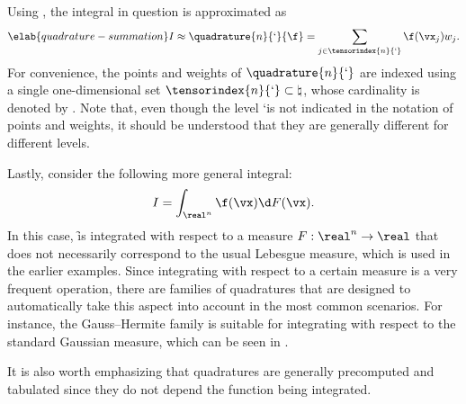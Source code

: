 Using , the integral in question is approximated as
\begin{equation} \elab{quadrature-summation}
  I \approx \quadrature{n}{\lq}{\f}
  = \sum_{j \in \tensorindex{n}{\lq}} \f(\vx_j) w_j.
\end{equation}
For convenience, the points and weights of $\quadrature{n}{\lq}$ are indexed
using a single one-dimensional set $\tensorindex{n}{\lq} \subset \natural$,
whose cardinality is denoted by \nq. Note that, even though the level \lq is not
indicated in the notation of points and weights, it should be understood that
they are generally different for different levels.

Lastly, consider the following more general integral:
\[
  I = \int_{\real^n} \f(\vx) \d F(\vx).
\]
In this case, \f is integrated with respect to a measure $F: \real^n \to \real$
\cite{durrett2010} that does not necessarily correspond to the usual Lebesgue
measure, which is used in the earlier examples. Since integrating with respect
to a certain measure is a very frequent operation, there are families of
quadratures that are designed to automatically take this aspect into account in
the most common scenarios. For instance, the Gauss--Hermite family is suitable
for integrating with respect to the standard Gaussian measure, which can be seen
in .

It is also worth emphasizing that quadratures are generally precomputed and
tabulated since they do not depend the function being integrated.

